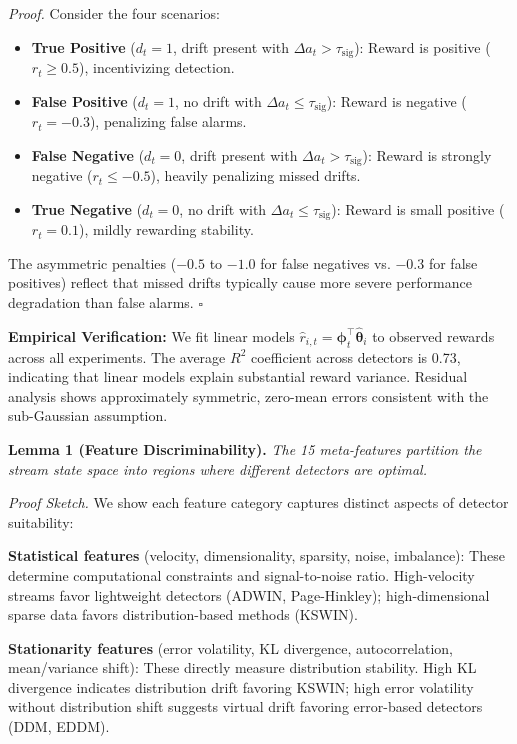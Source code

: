 \documentclass[11pt]{article}
\begin{document}
\textit{Proof.} Consider the four scenarios:
\begin{itemize}
\item \textbf{True Positive} ($d_t=1$, drift present with $\Delta a_t > \tau_{\text{sig}}$): Reward is positive ($r_t \geq 0.5$), incentivizing detection.
\item \textbf{False Positive} ($d_t=1$, no drift with $\Delta a_t \leq \tau_{\text{sig}}$): Reward is negative ($r_t = -0.3$), penalizing false alarms.
\item \textbf{False Negative} ($d_t=0$, drift present with $\Delta a_t > \tau_{\text{sig}}$): Reward is strongly negative ($r_t \leq -0.5$), heavily penalizing missed drifts.
\item \textbf{True Negative} ($d_t=0$, no drift with $\Delta a_t \leq \tau_{\text{sig}}$): Reward is small positive ($r_t = 0.1$), mildly rewarding stability.
\end{itemize}
The asymmetric penalties ($-0.5$ to $-1.0$ for false negatives vs. $-0.3$ for false positives) reflect that missed drifts typically cause more severe performance degradation than false alarms. \hfill $\square$


\textbf{Empirical Verification:} We fit linear models $\hat{r}_{i,t} = \boldsymbol{\phi}_t^\top \hat{\boldsymbol{\theta}}_i$ to observed rewards across all experiments. The average $R^2$ coefficient across detectors is 0.73, indicating that linear models explain substantial reward variance. Residual analysis shows approximately symmetric, zero-mean errors consistent with the sub-Gaussian assumption.

\textbf{Lemma 1 (Feature Discriminability).} \textit{The 15 meta-features partition the stream state space into regions where different detectors are optimal.}

\textit{Proof Sketch.} We show each feature category captures distinct aspects of detector suitability:

\textbf{Statistical features} (velocity, dimensionality, sparsity, noise, imbalance): These determine computational constraints and signal-to-noise ratio. High-velocity streams favor lightweight detectors (ADWIN, Page-Hinkley); high-dimensional sparse data favors distribution-based methods (KSWIN).

\textbf{Stationarity features} (error volatility, KL divergence, autocorrelation, mean/variance shift): These directly measure distribution stability. High KL divergence indicates distribution drift favoring KSWIN; high error volatility without distribution shift suggests virtual drift favoring error-based detectors (DDM, EDDM).
\end{document}
